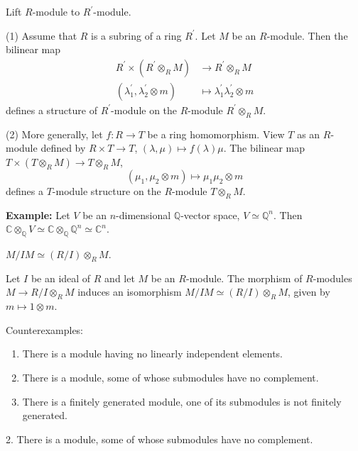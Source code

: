 \documentclass[11pt, a4paper]{report}
\begin{document}
\begin{proposition}
Lift $R$-module to $R^{\prime}$-module.

(1) Assume that $R$ is a subring of a ring $R^{\prime}$. Let $M$ be an $R$-module. Then the bilinear map
\[
\begin{aligned}
R^{\prime} \times (R^{\prime} \otimes_{R} M) &\longrightarrow R^{\prime} \otimes_{R} M \\
(\lambda_{1}^{\prime}, \lambda_{2}^{\prime} \otimes m) &\mapsto \lambda_{1}^{\prime} \lambda_{2}^{\prime} \otimes m
\end{aligned}
\]
defines a structure of $R^{\prime}$-module on the $R$-module $R^{\prime} \otimes_{R} M$.

(2) More generally, let $f\colon R \rightarrow T$ be a ring homomorphism. View $T$ as an $R$-module defined by $R \times T \rightarrow T$, $(\lambda, \mu) \mapsto f(\lambda)\mu$. The bilinear map $T \times (T \otimes_{R} M) \rightarrow T \otimes_{R} M$,
\[
(\mu_{1}, \mu_{2} \otimes m) \mapsto \mu_{1} \mu_{2} \otimes m
\]
defines a $T$-module structure on the $R$-module $T \otimes_{R} M$.

\textbf{Example:} Let $V$ be an $n$-dimensional $\mathbb{Q}$-vector space, $V \simeq \mathbb{Q}^{n}$. Then $\mathbb{C} \otimes_{\mathbb{Q}} V \simeq \mathbb{C} \otimes_{\mathbb{Q}} \mathbb{Q}^{n} \simeq \mathbb{C}^{n}$.
\end{proposition}

\begin{lemma}
$M / IM \simeq (R / I) \otimes_{R} M$.

Let $I$ be an ideal of $R$ and let $M$ be an $R$-module. The morphism of $R$-modules $M \rightarrow R / I \otimes_{R} M$ induces an isomorphism $M / IM \simeq (R / I) \otimes_{R} M$, given by $m \mapsto 1 \otimes m$.
\end{lemma}

\begin{example}
Counterexamples:
\begin{enumerate}
\item There is a module having no linearly independent elements.
\item There is a module, some of whose submodules have no complement.
\item There is a finitely generated module, one of its submodules is not finitely generated.
\end{enumerate}
\end{example}
2. There is a module, some of whose submodules have no complement.
\end{document}
